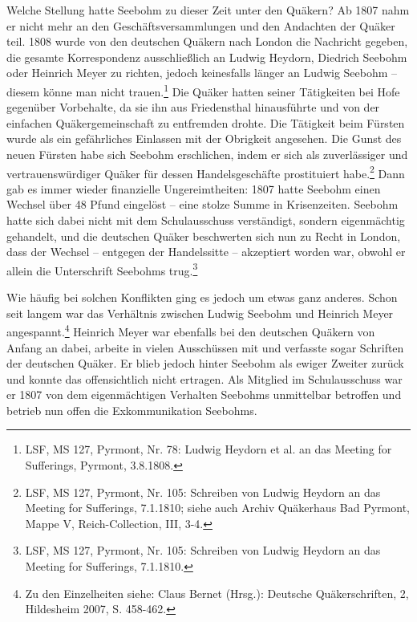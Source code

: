 Welche Stellung hatte Seebohm zu dieser Zeit unter den Quäkern? Ab 1807 nahm er
nicht mehr an den Geschäftsversammlungen und den Andachten der Quäker teil. 1808
wurde von den deutschen Quäkern nach London die Nachricht gegeben, die gesamte
Korrespondenz ausschließlich an Ludwig Heydorn, Diedrich Seebohm oder Heinrich
Meyer zu richten, jedoch keinesfalls länger an Ludwig Seebohm -- diesem könne
man nicht trauen.\footnote{LSF, MS 127, Pyrmont, Nr. 78: Ludwig Heydorn et al.
an das Meeting for
Sufferings, Pyrmont, 3.8.1808.} Die Quäker hatten seiner Tätigkeiten bei Hofe
gegenüber Vorbehalte, da sie ihn aus Friedensthal hinausführte und von der
einfachen Quäkergemeinschaft zu entfremden drohte. Die Tätigkeit beim Fürsten
wurde als ein gefährliches Einlassen mit der Obrigkeit angesehen. Die Gunst des
neuen Fürsten habe sich Seebohm erschlichen, indem er sich als zuverlässiger und
vertrauenswürdiger Quäker für dessen Handelsgeschäfte prostituiert
habe.\footnote{LSF, MS 127, Pyrmont, Nr. 105: Schreiben von Ludwig Heydorn an
das Meeting
for Sufferings, 7.1.1810; siehe auch Archiv Quäkerhaus Bad Pyrmont, Mappe V,
Reich-Collection, III, 3-4.}
Dann gab es immer wieder finanzielle Ungereimtheiten: 1807 hatte Seebohm einen
Wechsel über 48 Pfund eingelöst -- eine stolze Summe in Krisenzeiten. Seebohm
hatte sich dabei nicht mit dem Schulausschuss verständigt, sondern eigenmächtig
gehandelt, und die deutschen Quäker beschwerten sich nun zu Recht in London,
dass der Wechsel -- entgegen der Handelssitte -- akzeptiert worden war, obwohl
er allein die Unterschrift Seebohms trug.\footnote{LSF, MS 127, Pyrmont, Nr.
105: Schreiben von Ludwig Heydorn an das Meeting
for Sufferings, 7.1.1810.}

\medskip

Wie häufig bei solchen Konflikten ging es jedoch um etwas ganz anderes. Schon
seit langem war das Verhältnis zwischen Ludwig Seebohm und Heinrich Meyer
angespannt.\footnote{Zu den Einzelheiten siehe: Claus Bernet (Hrsg.): Deutsche
Quäkerschriften,
2, Hildesheim 2007, S. 458-462.} Heinrich Meyer war ebenfalls bei den deutschen
Quäkern von Anfang an dabei, arbeite in vielen Ausschüssen mit und verfasste
sogar Schriften der deutschen Quäker. Er blieb jedoch hinter Seebohm als ewiger
Zweiter zurück und konnte das offensichtlich nicht ertragen. Als Mitglied im
Schulausschuss war er 1807 von dem eigenmächtigen Verhalten Seebohms unmittelbar
betroffen und betrieb nun offen die Exkommunikation Seebohms.

\medskip

